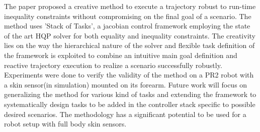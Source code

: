 The paper proposed a creative method to execute a trajectory robust to run-time inequality constraints without compromising on the final goal of a scenario. The method uses 'Stack of Tasks', a jacobian control framework employing the state of the art HQP solver for both equality and inequality constraints. The creativity lies on the way the hierarchical nature of the solver and flexible task definition of the framework is exploited to combine an intuitive main goal definition and reactive trajectory execution to realize a scenario successfully robustly. Experiments were done to verify the validity of the method on a PR2 robot with a skin sensor(in simulation) mounted on its forearm. Future work will focus on generalizing the method for various kind of tasks and extending the framework to systematically design tasks to be added in the controller stack specific to possible desired scenarios. The methodology has a significant potential to 
be used for a robot setup with full body skin sensors.